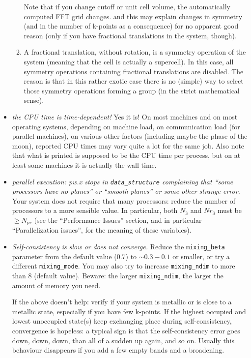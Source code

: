 \documentclass[12pt]{article}
\begin{document}
\begin{itemize}
\begin{enumerate}
         Note that if you change cutoff or unit cell volume, the
         automatically computed FFT grid changes. and this may explain
         changes in symmetry (and in the number of k-points as a 
         consequence) for no apparent good reason (only if you have
         fractional translations in the system, though).
      \item
       A fractional translation, without rotation, is a symmetry
         operation of the system (meaning that the cell is actually
         a supercell). In this case, all symmetry operations containing
         fractional translations are disabled. The reason is that in this
         rather exotic case there is no (simple) way to select those
         symmetry operations forming a group (in the strict mathematical
         sense).
       \end{enumerate}
\item {\em the CPU time is time-dependent!}
      Yes it is! On most machines and on most operating systems,
      depending on machine load, on communication load (for parallel 
      machines), on various other factors (including maybe the 
      phase of the moon), reported CPU times may vary quite a
      lot for the same job. Also note that what is printed is 
      supposed to be the CPU time per process, but on at least
      some machines it is actually the wall time.
\item {\em parallel execution: pw.x stops in {\tt data\_structure}
       complaining that ``some processors have no planes'' or
       ``smooth planes'' or some other strange error.} 
      Your system does not require that many processors:
      reduce the number of processors to a more sensible value.
      In particular, both $N_3$ and $Nr_3$ must be $\ge N_{pr}$ 
      (see the ``Performance Issues'' section, and in particular
      ``Parallelization issues'', for the meaning of these variables).
\item {\em Self-consistency is slow or does not converge.}
      Reduce the {\tt mixing\_beta} parameter from the default value
      (0.7) to $\sim 0.3-0.1$ or smaller, or try a different
      {\tt mixing\_mode}. You may also try to increase {\tt mixing\_ndim} 
      to more than 8 (default value). Beware: the larger {\tt mixing\_ndim},
      the larger the amount of memory you need.

      If the above doesn't help: verify if your system is metallic 
      or is close to a metallic state, especially if you have few
      k-points. If the highest occupied and lowest unoccupied
      state(s) keep exchanging place during self-consistency, 
      convergence is hopeless: a typical sign is that the 
      self-consistency error goes down, down, down, than all
      of a sudden up again, and so on. Usually this behaviour
      disappears if you add a few empty bands and a broadening.


\end{itemize}
\end{document}

